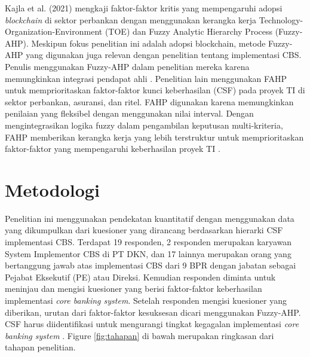 \documentclass[journal,article,submit,pdftex,moreauthors]{Definitions/mdpi}
\begin{document}
Kajla et al. (2021) mengkaji faktor-faktor kritis yang mempengaruhi adopsi \textit{blockchain} di sektor perbankan dengan menggunakan kerangka kerja Technology-Organization-Environment (TOE) dan Fuzzy Analytic Hierarchy Process (Fuzzy-AHP). Meskipun fokus penelitian ini adalah adopsi blockchain, metode Fuzzy-AHP yang digunakan juga relevan dengan penelitian tentang implementasi CBS. Penulis menggunakan Fuzzy-AHP dalam penelitian mereka karena memungkinkan integrasi pendapat ahli \cite{KajlaFAHP}. Penelitian lain menggunakan FAHP untuk memprioritaskan faktor-faktor kunci keberhasilan (CSF) pada proyek TI di sektor perbankan, asuransi, dan ritel. FAHP digunakan karena memungkinkan penilaian yang fleksibel dengan menggunakan nilai interval. Dengan mengintegrasikan logika fuzzy dalam pengambilan keputusan multi-kriteria, FAHP memberikan kerangka kerja yang lebih terstruktur untuk memprioritaskan faktor-faktor yang mempengaruhi keberhasilan proyek TI \cite{Siddique-fahp}.


\section{Metodologi}
Penelitian ini menggunakan pendekatan kuantitatif dengan menggunakan data yang dikumpulkan dari kuesioner yang dirancang berdasarkan hierarki CSF implementasi CBS. Terdapat 19 responden, 2 responden merupakan karyawan System Implementor CBS di PT DKN, dan 17 lainnya merupakan orang yang bertanggung jawab atas implementasi CBS dari 9 BPR dengan jabatan sebagai Pejabat Eksekutif (PE) atau Direksi. Kemudian responden diminta untuk meninjau dan mengisi kuesioner yang berisi faktor-faktor keberhasilan implementasi \textit{core banking system}. Setelah responden mengisi kuesioner yang diberikan, urutan dari faktor-faktor kesuksesan dicari menggunakan Fuzzy-AHP. CSF harus diidentifikasi untuk mengurangi tingkat kegagalan implementasi \textit{core banking system} \cite{aggestam2023apply}. Figure \ref{fig:tahapan} di bawah merupakan ringkasan dari tahapan penelitian.

\end{document}

